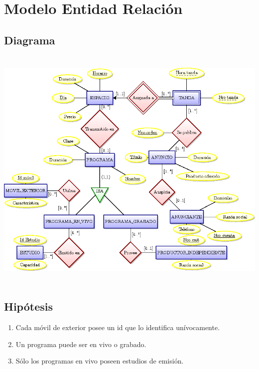 \documentclass[a4paper,10pt]{article}
\begin{document}

\setcounter{page}{2}

\newpage
\thispagestyle{empty}
\tableofcontents

\newpage
\section{Modelo Entidad Relaci\'on}
  \subsection{Diagrama}
    \begin{center}
      \includegraphics[width=18cm, height=12cm, angle=-90]{ModeloE-R/ModeloE-R.png}   
    \end{center}
  \subsection{Hip\'otesis}
    \begin{enumerate}
      \item Cada m\'ovil de exterior posee un id que lo identifica un\'ivocamente. 
      \item Un programa puede ser en vivo o grabado.
      \item S\'olo los programas en vivo poseen estudios de emisi\'on.
    \end{enumerate}
    
\end{document}
